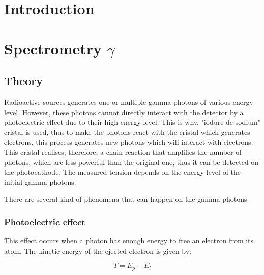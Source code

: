 \documentclass[a4paper,12pt,oneside]{article}
\begin{document}
\title{}
\author{Laurent Rohrbasser \& Tim Tuuva}

\maketitle
\tableofcontents
\baselineskip=16pt
\parindent=15pt
\parskip=5pt

\begin{abstract}
\end{abstract}

\section{Introduction}

\section{Spectrometry $\gamma$}
\subsection{Theory}
Radioactive sources generates one or multiple gamma photons of various 
energy level. However, these photons cannot directly interact with the
 detector by a photoelectric effect due to their high energy level. 
This is why, "iodure de sodium" cristal is used, thus to make the 
photons react with the cristal which generates electrons, this 
process generates new photons which will interact with electrons. 
This cristal realises, therefore, a chain reaction that amplifies the 
number of photons, which are less powerful than the original one, 
thus it can be detected on the photocathode. The measured tension 
depends on the energy level of the initial gamma photons.

There are several kind of phenomena that can happen on the gamma photons.
\subsubsection{Photoelectric effect}
This effect occurs when a photon has enough energy to free an electron from its atom. The kinetic energy of the ejected electron is given by:

$$T=E_p - E_l$$
\end{document}
